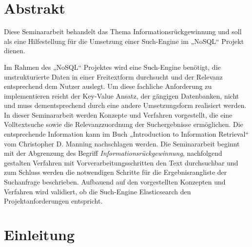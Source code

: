 \section[Abstrakt ]{Abstrakt }



Diese Seminararbeit behandelt das Thema Informationsrückgewinnung und
soll als eine Hilfestellung für die Umsetzung einer Such-Engine im
„NoSQL“ Projekt dienen. 

Im Rahmen des „NoSQL“ Projektes wird eine Such-Engine benötigt, die
unstrukturierte Daten in einer Freitextform durchsucht und der Relevanz
entsprechend dem Nutzer auslegt. Um diese fachliche Anforderung zu
implementieren reicht der Key-Value Ansatz, der gängigen Datenbanken,
nicht und muss dementsprechend durch eine andere Umsetzungsform
realisiert werden. In dieser Seminararbeit werden Konzepte und
Verfahren vorgestellt, die eine Volltextsuche sowie die
Relevanzzuordnung der Suchergebnisse ermöglichen. Die entsprechende
Information kann im Buch „Introduction to Information Retrieval“ vom
Christopher D. Manning nachschlagen werden.
\newline
Die Seminararbeit beginnt mit der Abgrenzung des Begriff
\textit{Informationsrückgewinnung}, nachfolgend gestalten Verfahren mit
Vorverarbeitungsschritten den Text durchsuchbar und zum Schluss werden
die notwendigen Schritte für die Ergebnisrangliste der Suchanfrage
beschrieben. 
\newline
Aufbauend auf den vorgestellten Konzepten und Verfahren wird validiert,
ob die Such-Engine {\textquotedbl}Elasticsearch{\textquotedbl} den
Projektanforderungen entspricht.




\section[Einleitung]{Einleitung}



